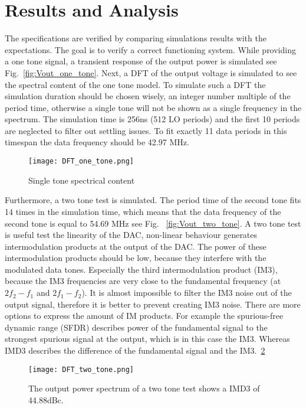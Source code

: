 \section{Results and Analysis}\label{sec:simulations}
The specifications are verified by comparing simulations results with the expectations. The goal is to verify a correct functioning system. While providing a one tone signal, a transient response of the output power is simulated see Fig.~\ref{fig:Vout_one_tone}.
Next, a DFT of the output voltage is simulated to see the spectral content of the one tone model. To simulate such a DFT the simulation duration should be chosen wisely, an integer number multiple of the period time, otherwise a single tone will not be shown as a single frequency in the spectrum. The simulation time is 256ns (512 LO periods) and the first 10 periods are neglected to filter out settling issues. To fit exactly 11 data periods in this timespan the data frequency should be 42.97 MHz.
\begin{figure}[h] 
\texttt{[image: DFT\_one\_tone.png]}
\caption{Single tone spectrical content}
\label{fig:transient_single_tone}
\end{figure}
Furthermore, a two tone test is simulated. The period time of the second tone fits 14 times in the simulation time, which means that the data frequency of the second tone is equal to 54.69 MHz see Fig. ~\ref{fig:Vout_two_tone}. A two tone test is useful test the linearity of the DAC, non-linear behaviour generates intermodulation products at the output of the DAC. The power of these intermodulation products should be low, because they interfere with the modulated data tones. Especially the third intermodulation product (IM3), because the IM3 frequencies are very close to the fundamental frequency (at $2f_2-f_1$ and $2f_1-f_2$). It is almost impossible to filter the IM3 noise out of the output signal, therefore it is better to prevent creating IM3 noise. There are more options to express the amount of IM products. For example the spurious-free dynamic range (SFDR) describes power of the fundamental signal to the strongest spurious signal at the output, which is in this case the IM3. Whereas IMD3 describes the difference of the fundamental signal and the IM3.~\ref{fig:DFT_two_tone}
\begin{figure}[h] 
\texttt{[image: DFT\_two\_tone.png]}
\caption{The output power spectrum of a two tone test shows a IMD3 of 44.88dBc.}
\label{fig:DFT_two_tone}
\end{figure}

